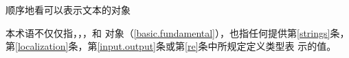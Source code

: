 顺序地看可以表示文本的对象

\begin{note}
  本术语不仅仅指，，，和
  对象（\ref{basic.fundamental}），也指任何提供第\ref{strings}条，
  第\ref{localization}条，第\ref{input.output}条或第\ref{re}条中所规定定义类型表
  示的值。
\end{note}
